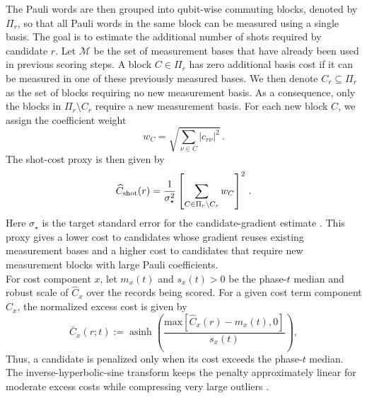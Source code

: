 \documentclass[
  reprint,
  amsmath,
  amssymb,
  aps,
  pra,
  nofootinbib,
  superscriptaddress,
  floatfix
]{revtex4-2}
\begin{document}
The Pauli words are then grouped into qubit-wise commuting blocks, denoted by \(\Pi_r\), so that all Pauli words in the same block can be measured using a single basis. The goal is to estimate the additional number of shots required by candidate \(r\). Let \(\mathcal M\) be the set of measurement bases that have already been used in previous scoring steps. A block \(C\in\Pi_r\) has zero additional basis cost if it can be measured in one of these previously measured bases. We then denote \(C_r\subseteq\Pi_r\) as the set of blocks requiring no new measurement basis. As a consequence, only the blocks in \(\Pi_r\setminus C_r\) require a new measurement basis.
For each new block \(C\), we assign the coefficient weight
\[
w_C = \sqrt{\sum_{\nu\in C}|c_{r\nu}|^2}\,.
\]
The shot-cost proxy is then given by
\begin{equation*}
\widehat C_{\rm shot}(r)=
\frac{1}{\sigma_\star^2}
\left[
\sum_{C\in\Pi_r\setminus C_r}
w_C
\right]^2\,.
\end{equation*}
%
Here $\sigma_\star$ is the target standard error for the candidate-gradient estimate \cite{Ikhtiarudin2025ShotEfficient}. This proxy gives a lower cost to candidates whose gradient reuses existing measurement bases and a higher cost to candidates that require new measurement blocks with large Pauli coefficients.\\
For cost component \(x\), let \(m_x(t)\) and \(s_x(t)>0\) be the phase-\(t\) median and robust scale of \(\widehat C_x\) over the records being scored. For a given cost term component $\widehat C_x$, the normalized excess cost is given by
%
\begin{equation}
\bar C_x(r;t):=
\operatorname{asinh}
\left(
\frac{\text{max}[\widehat C_x(r)-m_x(t), 0]}{s_x(t)}
\right),
\label{eq:cost_robust_excess}
\end{equation}
%
Thus, a candidate is penalized only when its cost exceeds the phase-\(t\) median. The inverse-hyperbolic-sine transform keeps the penalty approximately linear for moderate excess costs while compressing very large outliers \cite{IglewiczHoaglin1993,Burbidge1988IHS}.
\end{document}
